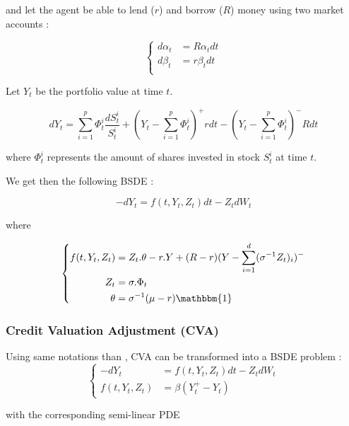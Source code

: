 \documentclass[english,11pt,openany]{article}
\theoremstyle{definition}
\theoremstyle{plain}
\theoremstyle{definition}
\begin{document}
	and let the agent be able to lend ($r$) and borrow ($R$) money using two market accounts : 
	
	\begin{equation}
	\left\{
	\begin{aligned}
	d\alpha_t &= R \alpha_t dt\\
	d\beta_t &= r \beta_t dt\\
	\end{aligned}
	\right.
	\end{equation}
	
	Let $Y_t$ be the portfolio value at time $t$. 
	
	\begin{displaymath}
	dY_t = \sum_{i = 1}^{p} \Phi^i_t \frac{dS^i_t}{S^i_t} + (Y_t - \sum_{i = 1}^{p} \Phi^i_t)^+rdt - (Y_t - \sum_{i = 1}^{p} \Phi^i_t)^-Rdt
	\end{displaymath}
	
	where $\Phi^i_t$ represents the amount of shares invested in stock $S_t^i$ at time $t$.
	
	We get then the following BSDE : 
	
	\begin{equation}
	-dY_t = f(t,Y_t,Z_t)dt - Z_tdW_t  
	\end{equation}
	
	where 
	
	\[
	\left\{
	\begin{aligned}
	f(t,Y_t,Z_t) & =   Z_t.\theta - r.Y + (R-r)(Y- \sum_{i=1}^{d}(\sigma^{-1}Z_t)_i)^-\\
	Z_t & = \sigma. \Phi_t\\
	\theta &= \sigma^{-1}(\mu - r)\mathbbm{1}
	\end{aligned}
	\right.
	\]
	
	
	\subsubsection{Credit Valuation Adjustment (CVA)}
	
	Using same notations than \cite{GuyonLabordere:cva}, CVA can be transformed into a BSDE problem :
	\begin{displaymath}
	\left\{
	\begin{aligned}
	-dY_t& = f(t,Y_t,Z_t)dt - Z_tdW_t \\
	f(t,Y_t,Z_t) & =  \beta (Y_t^+ - Y_t)
	\end{aligned}
	\right.
	\end{displaymath}
	
	with the corresponding semi-linear PDE 
	
\end{document}
